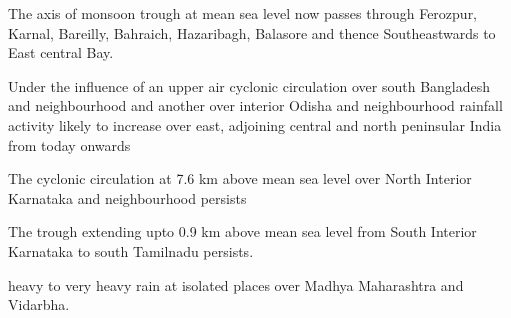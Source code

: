 \item  The   axis   of   monsoon   trough   at   mean   sea   level  now  passes  through   Ferozpur,   Karnal,   Bareilly,   Bahraich, 
Hazaribagh, Balasore and thence Southeastwards to East central Bay.

\item Under the influence of an upper air cyclonic circulation over south Bangladesh and neighbourhood and another over  
interior Odisha and neighbourhood rainfall activity likely to increase over east, adjoining central and north peninsular 
India from today onwards

\item The cyclonic circulation at 7.6 km above mean sea level over North Interior Karnataka and neighbourhood persists
\item The  trough extending upto 0.9  km above mean  sea level  from  South Interior Karnataka to south  Tamilnadu 
persists.
\item heavy to very heavy rain at isolated places over Madhya Maharashtra and Vidarbha.


